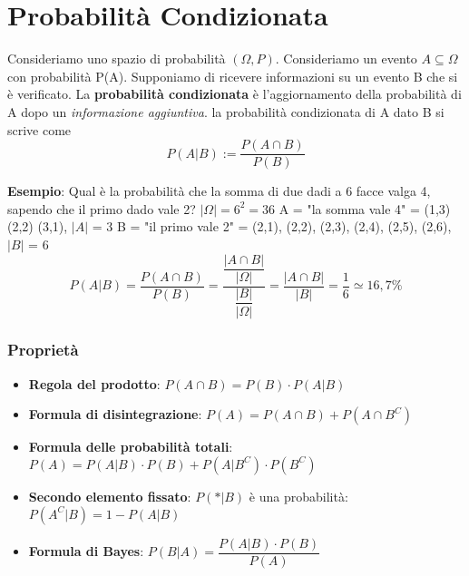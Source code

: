 
\section{Probabilità Condizionata}

Consideriamo uno spazio di probabilità $(\Omega, P)$. Consideriamo un evento $A \subseteq \Omega $ con probabilità P(A). Supponiamo di ricevere informazioni su un evento B che si è verificato. \newline
La \textbf{probabilità condizionata} è l'aggiornamento della probabilità di A dopo un \textit{informazione aggiuntiva}. la probabilità condizionata di A dato B si scrive come $$ P(A | B) := \dfrac{P(A \cap B)}{P(B)}$$

\begin{tcolorbox}
    \textbf{Esempio}: Qual è la probabilità che la somma di due dadi a 6 facce valga 4, sapendo che il primo dado vale 2? \newline
    $|\Omega| = 6^2 = 36 $ \newline
    A = "la somma vale 4" = {(1,3) (2,2) (3,1)}, $|A|$ = 3 \newline
    B = "il primo vale 2" = {(2,1), (2,2), (2,3), (2,4), (2,5), (2,6)}, $|B|$ = 6 \newline
    $$P(A | B) = \dfrac{P(A \cap B)}{P(B)} = \dfrac{\dfrac{|A \cap B|}{|\Omega|}}{\dfrac{|B|}{|\Omega|}} = \dfrac{|A \cap B|}{|B|} = \dfrac{1}{6} \simeq 16,7\% $$
\end{tcolorbox} 

\subsubsection{Proprietà}

\begin{itemize}
    \item \textbf{Regola del prodotto}: $P(A \cap B) = P(B) \cdot P(A | B)$
    \item \textbf{Formula di disintegrazione}: $P(A) = P(A \cap B) + P(A \cap B^C)$
    \item \textbf{Formula delle probabilità totali}: $P(A) = P(A | B) \cdot P(B) + P(A | B^C) \cdot P(B^C)$
    \item \textbf{Secondo elemento fissato}: $P(* | B)$ è una probabilità: $P(A^C | B) = 1 - P(A | B)$
    \item \textbf{Formula di Bayes}: $P(B | A) = \dfrac{P(A | B) \cdot P(B)}{P(A)}$
\end{itemize}

